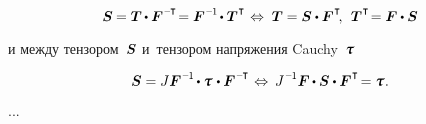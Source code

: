 \begin{otherlanguage}{russian}
\nopagebreak\vspace{-0.12em}\begin{equation*}
\secondpiolakirchhoffstress \hspace{-0.1ex}
= \firstpiolakirchhoffstress \hspace{-0.1ex} \dotp \bm{F}^{\hspace{.1ex}\expminusT} \hspace{-0.4ex}
= \bm{F}^{\hspace{.1ex}\expminusone} \hspace{-0.25ex} \dotp \firstpiolakirchhoffstress^{\hspace{.1ex}\T}
%
\hspace{.2ex} \Leftrightarrow \hspace{.64ex}
%
\firstpiolakirchhoffstress = \secondpiolakirchhoffstress \dotp \bm{F}^{\hspace{.1ex}\T}
\hspace{-0.4ex} , \:\:
\firstpiolakirchhoffstress^{\hspace{.1ex}\T} \hspace{-0.4ex} = \bm{F} \dotp \secondpiolakirchhoffstress
\end{equation*}

\vspace{-0.2em} \noindent и между тензором~$\bm{S}$ и~тензором напряжения Cauchy~$\cauchystress$

\nopagebreak\vspace{-0.12em}\begin{equation*}
\secondpiolakirchhoffstress = J \bm{F}^{\hspace{.1ex}\expminusone} \hspace{-0.2ex} \dotp \cauchystress \hspace{.16ex} \dotp \bm{F}^{\hspace{.1ex}\expminusT}
\hspace{.2ex} \Leftrightarrow \hspace{.5ex}
J^{\hspace{.12ex}\expminusone} \bm{F} \hspace{-0.1ex} \dotp \secondpiolakirchhoffstress \dotp \bm{F}^{\hspace{.1ex}\T} \hspace{-0.32ex}
= \cauchystress \hspace{.1ex}.
\end{equation*}

...


\end{otherlanguage}
